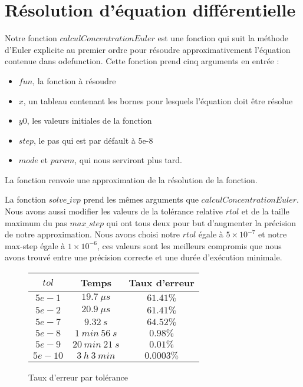 \documentclass[11pt]{report}
\begin{document}
        \section{Résolution d'équation différentielle}
            Notre fonction $calculConcentrationEuler$ est une fonction qui suit la méthode d'Euler explicite au premier ordre
            pour résoudre approximativement l'équation contenue dans odefunction.
            Cette fonction prend cinq arguments en entrée :
            \begin{itemize}
                \item $fun$, la fonction à résoudre
                \item $x$, un tableau contenant les bornes pour lesquels l'équation doit être résolue
                \item $y0$, les valeurs initiales de la fonction
                \item $step$, le pas qui est par défault à 5e-8
                \item $mode$ et $param$, qui nous serviront plus tard.
            \end{itemize}
            La fonction renvoie une approximation de la résolution de la fonction.
            \par
            La fonction $solve\_ivp$ prend les mêmes arguments que $calculConcentrationEuler$. 
            Nous avons aussi modifier les valeurs de la tolérance relative $rtol$ et de la taille maximum du pas $max\_step$
            qui ont tous deux pour but d'augmenter la précision de notre approximation.
            Nous avons choisi notre $rtol$ égale à $5\times10^{-7}$ et notre max-step égale à $1\times10^{-6}$,
            ces valeurs sont les meilleurs compromis que nous avons trouvé entre une précision correcte
            et une durée d'exécution minimale.
            \par
            \begin{figure}[h]
                \centering
                \begin{tabular}{|c|c|c|}
                    \hline
                    $tol$   & Temps             & Taux d'erreur\\
                    \hline
                    \hfill $5e-1$  & \hfill $19.7\ \mu s$     & \hfill $61.41\%$\\
                    \hfill $5e-2$  & \hfill $20.9\ \mu s$     & \hfill $61.41\%$\\
                    \hfill $5e-7$  & \hfill $9.32\ s$         & \hfill $64.52\%$\\
                    \hfill $5e-8$  & \hfill $1\ min\ 56\ s$   & \hfill $0.98\%$\\
                    \hfill $5e-9$  & \hfill $20\ min\ 21\ s$  & \hfill $0.01\%$\\
                    \hfill $5e-10$ & \hfill $3\ h\ 3\ min$    & \hfill $0.0003\%$\\
                    \hline
                \end{tabular}
                \caption{Taux d'erreur par tolérance}
                \label{tab:tol}
            \end{figure}
\end{document}
